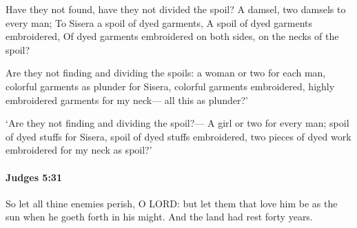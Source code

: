 			\begin{versebox}
					\item[BHS] 
					\item[ASV] Have they not found, have they not divided the spoil? A damsel, two damsels to every man; To Sisera a spoil of dyed garments, A spoil of dyed garments embroidered, Of dyed garments embroidered on both sides, on the necks of the spoil?
					\item[NIV] Are they not finding and dividing the spoils: a woman or two for each man, colorful garments as plunder for Sisera, colorful garments embroidered, highly embroidered garments for my neck— all this as plunder?’
					\item[NRSV] ‘Are they not finding and dividing the spoil?— A girl or two for every man; spoil of dyed stuffs for Sisera, spoil of dyed stuffs embroidered, two pieces of dyed work embroidered for my neck as spoil?’
			\end{versebox}

		\paragraph{Judges 5:31} %
			\label{JUDGES-5-31}

			So let all thine enemies perish, O LORD: but let them that love him be as the sun when he goeth forth in his might. And the land had rest forty years.

